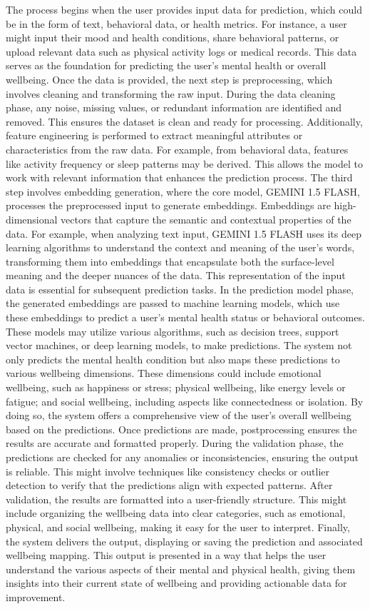 \noindent
The process begins when the user provides input data for prediction, which could be in the form of text, behavioral data, or health metrics. For instance, a user might input their mood and health conditions, share behavioral patterns, or upload relevant data such as physical activity logs or medical records. This data serves as the foundation for predicting the user's mental health or overall wellbeing. Once the data is provided, the next step is preprocessing, which involves cleaning and transforming the raw input. During the data cleaning phase, any noise, missing values, or redundant information are identified and removed. This ensures the dataset is clean and ready for processing. Additionally, feature engineering is performed to extract meaningful attributes or characteristics from the raw data. For example, from behavioral data, features like activity frequency or sleep patterns may be derived. This allows the model to work with relevant information that enhances the prediction process. The third step involves embedding generation, where the core model, GEMINI 1.5 FLASH, processes the preprocessed input to generate embeddings. Embeddings are high-dimensional vectors that capture the semantic and contextual properties of the data. For example, when analyzing text input, GEMINI 1.5 FLASH uses its deep learning algorithms to understand the context and meaning of the user's words, transforming them into embeddings that encapsulate both the surface-level meaning and the deeper nuances of the data. This representation of the input data is essential for subsequent prediction tasks. In the prediction model phase, the generated embeddings are passed to machine learning models, which use these embeddings to predict a user's mental health status or behavioral outcomes. These models may utilize various algorithms, such as decision trees, support vector machines, or deep learning models, to make predictions. The system not only predicts the mental health condition but also maps these predictions to various wellbeing dimensions. These dimensions could include emotional wellbeing, such as happiness or stress; physical wellbeing, like energy levels or fatigue; and social wellbeing, including aspects like connectedness or isolation. By doing so, the system offers a comprehensive view of the user's overall wellbeing based on the predictions. Once predictions are made, postprocessing ensures the results are accurate and formatted properly. During the validation phase, the predictions are checked for any anomalies or inconsistencies, ensuring the output is reliable. This might involve techniques like consistency checks or outlier detection to verify that the predictions align with expected patterns. After validation, the results are formatted into a user-friendly structure. This might include organizing the wellbeing data into clear categories, such as emotional, physical, and social wellbeing, making it easy for the user to interpret. Finally, the system delivers the output, displaying or saving the prediction and associated wellbeing mapping. This output is presented in a way that helps the user understand the various aspects of their mental and physical health, giving them insights into their current state of wellbeing and providing actionable data for improvement.


